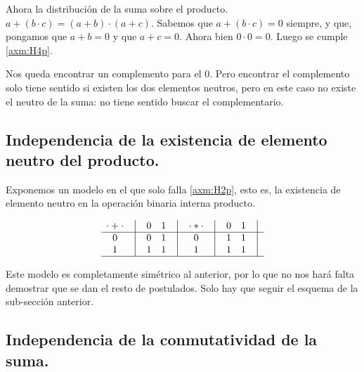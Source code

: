 	Ahora la distribución de la suma sobre el producto. \( a + ( b \cdot c )
= (a + b) \cdot (a + c) \). Sabemos que \(a + (b \cdot c) = 0\) siempre, y
que, pongamos que \( a + b = 0 \) y que \(a + c = 0 \). Ahora bien \(0 \cdot
0 = 0\). Luego se cumple \ref{axm:H4p}.


	Nos queda encontrar un complemento para el \(0\). Pero encontrar el
complemento solo tiene sentido si existen los dos elementos neutros, pero en
este caso no existe el neutro de la suma: no tiene sentido buscar el
complementario.



\subsection{Independencia de la existencia de elemento neutro del producto.}



	Exponemos un modelo en el que solo falla \ref{axm:H2p}, esto es, la existencia de elemento neutro en la operación binaria interna producto.



\[
    \begin{matrix}
        {\cdot + \cdot} & \big{\vert} & {0} & {1} & \big{\vert} \\
        \hline
        {0}             & \big{\vert} & {0} & {1} & \big{\vert} \\
        {1}             & \big{\vert} & {1} & {1} & \big{\vert} \\
        \hline
    \end{matrix}
    \quad
    \begin{matrix}
        {\cdot * \cdot} & \big{\vert} & {0} & {1} & \big{\vert} \\
        \hline
        {0}                   & \big{\vert} & {1} & {1} & \big{\vert} \\
        {1}                   & \big{\vert} & {1} & {1} & \big{\vert} \\
        \hline
    \end{matrix}
\]


	Este modelo es completamente simétrico al anterior, por lo que no nos
hará falta demostrar que se dan el resto de postulados. Solo hay que seguir
el esquema de la sub-sección anterior.



\subsection{Independencia de la conmutatividad de la suma.}



